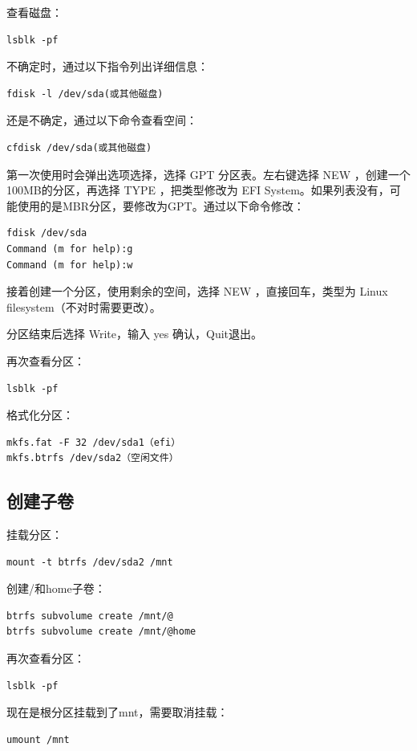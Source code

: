 \documentclass[a4paper, twocolumn, twoside, 10pt]{article}
\begin{document}
查看磁盘：
\begin{lstlisting}
lsblk -pf
\end{lstlisting}

不确定时，通过以下指令列出详细信息：
\begin{lstlisting}
fdisk -l /dev/sda(或其他磁盘)
\end{lstlisting}

还是不确定，通过以下命令查看空间：
\begin{lstlisting}
cfdisk /dev/sda(或其他磁盘)
\end{lstlisting}

第一次使用时会弹出选项选择，选择 GPT 分区表。左右键选择 NEW ，创建一个100MB的分区，再选择 TYPE ，把类型修改为 EFI System。如果列表没有，可能使用的是MBR分区，要修改为GPT。通过以下命令修改：
\begin{lstlisting}
fdisk /dev/sda
Command (m for help):g
Command (m for help):w
\end{lstlisting}

接着创建一个分区，使用剩余的空间，选择 NEW ，直接回车，类型为 Linux filesystem（不对时需要更改）。

分区结束后选择 Write，输入 yes 确认，Quit退出。

再次查看分区：
\begin{lstlisting}
lsblk -pf
\end{lstlisting}

格式化分区：
\begin{lstlisting}
mkfs.fat -F 32 /dev/sda1（efi）
mkfs.btrfs /dev/sda2（空闲文件）
\end{lstlisting}

\subsection{创建子卷}

挂载分区：
\begin{lstlisting}
mount -t btrfs /dev/sda2 /mnt
\end{lstlisting}

创建/和home子卷：
\begin{lstlisting}
btrfs subvolume create /mnt/@
btrfs subvolume create /mnt/@home
\end{lstlisting}

再次查看分区：
\begin{lstlisting}
lsblk -pf
\end{lstlisting}

现在是根分区挂载到了mnt，需要取消挂载：
\begin{lstlisting}
umount /mnt
\end{lstlisting}
\end{document}
